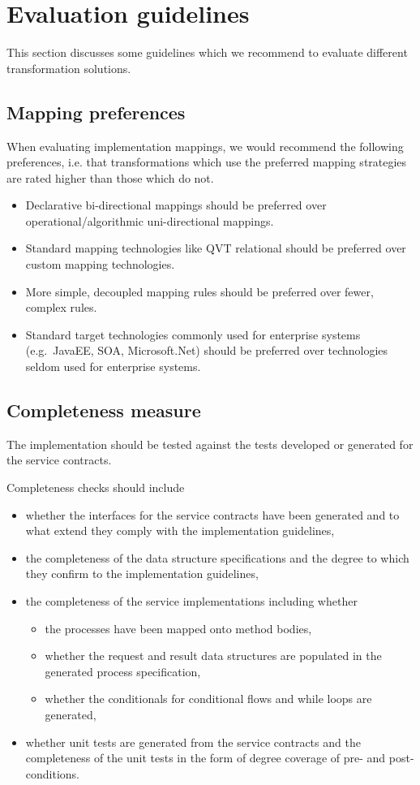 \section{Evaluation guidelines}

This section discusses some guidelines which we recommend to evaluate different transformation solutions.

\subsection{Mapping preferences}

When evaluating implementation mappings, we would recommend the following preferences, i.e. that transformations which use the preferred mapping strategies are rated higher than those which do not.
\begin{itemize}
  \item Declarative bi-directional mappings should be preferred over operational/algorithmic uni-directional mappings. 
  \item Standard mapping technologies like QVT relational should be preferred over custom mapping technologies.
  \item More simple, decoupled mapping rules should be preferred over fewer, complex rules.
  \item Standard target technologies commonly used for enterprise systems (e.g.\ JavaEE, SOA, Microsoft.Net) should be preferred over technologies seldom used for enterprise systems.
\end{itemize}

\subsection{Completeness measure}
The implementation should be tested against the tests developed or generated for the service contracts. 

Completeness checks should include
\begin{itemize}
  \item whether the interfaces for the service contracts have been generated and to what extend they comply with the implementation guidelines,
  \item the completeness of the data structure specifications and the degree to which they confirm to the implementation guidelines,
  \item the completeness of the service implementations including whether
    \begin{itemize}
     \item the processes have been mapped onto method bodies,
     \item whether the request and result data structures are populated in the generated process specification,
     \item whether the conditionals for conditional flows and while loops are generated,
    \end{itemize}
  \item whether unit tests are generated from the service contracts and the completeness of the unit tests in the form of degree coverage of pre- and post-conditions.
\end{itemize}

